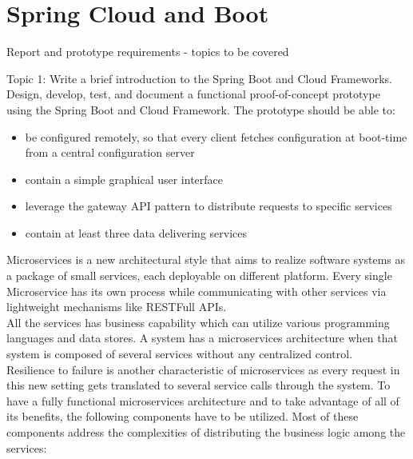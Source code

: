 \chapter{Spring Cloud and Boot}\label{ch:spring}
Report and prototype requirements - topics to be covered

Topic 1: Write a brief introduction to the Spring Boot and Cloud Frameworks. Design, develop, test, and document a functional proof-of-concept prototype using the Spring Boot and Cloud Framework. The prototype should be able to:
\begin{itemize}
\item be configured remotely, so that every client fetches configuration at boot-time from a central configuration server
\item contain a simple graphical user interface
\item leverage the gateway API pattern to distribute requests to specific services
\item contain at least three data delivering services 
\end{itemize}



Microservices is a new architectural style that aims to realize software systems as a package of small services, each deployable on different platform. Every single Microservice has its own process while communicating with other services via lightweight mechanisms like RESTFull APIs.\\

All the services has business capability which can utilize various programming languages and data stores. A system has a microservices architecture when that system is composed of several services without any centralized control.\\

Resilience to failure is another characteristic of microservices as every request in this new setting gets translated to
several service calls through the system. To have a fully functional microservices architecture and to take advantage of all of its benefits, the following components have to be utilized. Most of these components address the complexities of distributing the business logic among the services:

